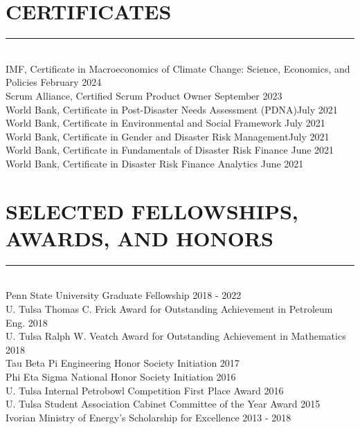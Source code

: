 \documentclass[overlapped]{res}
\begin{document}
\begin{resume}
\section{CERTIFICATES}
\vspace{-3 mm}
\noindent\rule{\textwidth}{1pt}\\
IMF, Certificate in Macroeconomics of Climate Change: Science, Economics, and Policies \hfill February 2024\\
Scrum Alliance, Certified Scrum Product Owner \hfill September 2023\\
World Bank, Certificate in Post-Disaster Needs Assessment (PDNA)\hfill  July 2021\\
World Bank, Certificate in Environmental and Social Framework \hfill  July 2021\\
World Bank, Certificate in Gender and Disaster Risk Management\hfill  July 2021\\
World Bank, Certificate in Fundamentals of Disaster Risk Finance  \hfill  June 2021\\
World Bank, Certificate in Disaster Risk Finance Analytics
\hfill June 2021\\[-4.5 mm]

\section{SELECTED FELLOWSHIPS, AWARDS, AND HONORS}
\vspace{-3 mm}
\noindent\rule{\textwidth}{1pt}\\
Penn State University Graduate Fellowship \hfill 2018 - 2022\\[1 mm]
U. Tulsa Thomas C. Frick Award for Outstanding Achievement in Petroleum Eng. \hfill 2018\\[1 mm]
U. Tulsa Ralph W. Veatch Award for Outstanding Achievement in Mathematics \hfill 2018\\[1 mm]
Tau Beta Pi Engineering Honor Society Initiation  \hfill 2017\\[1 mm]
Phi Eta Sigma National Honor Society Initiation  \hfill 2016\\[1 mm]
U. Tulsa Internal Petrobowl Competition First Place Award \hfill 2016\\[1 mm]
U. Tulsa Student Association Cabinet Committee of the Year Award \hfill 2015\\[1 mm]
Ivorian Ministry of Energy's Scholarship for Excellence \hfill 2013 - 2018\\[-6 mm]

\end{resume}
\end{document}
